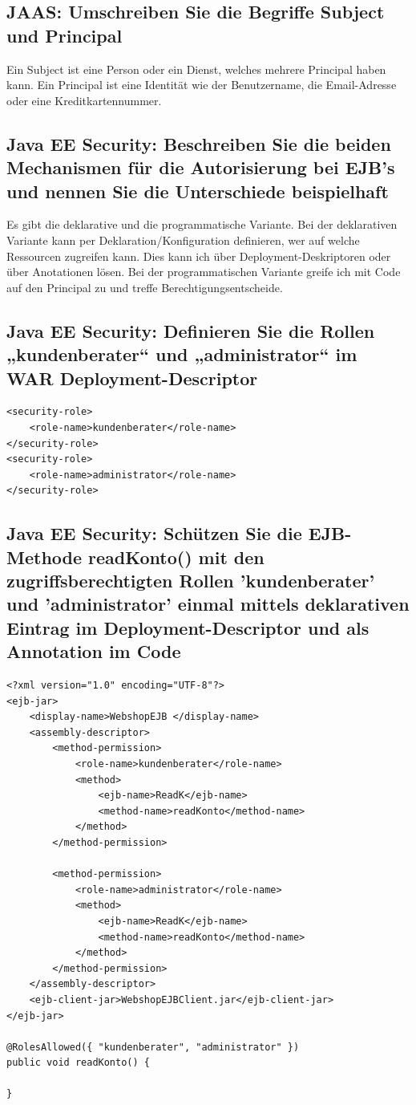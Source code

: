 \subsection{JAAS: Umschreiben Sie die Begriffe Subject und Principal}
Ein Subject ist eine Person oder ein Dienst, welches mehrere Principal haben kann. Ein Principal ist eine Identität wie der Benutzername, die Email-Adresse oder eine Kreditkartennummer.

\subsection{Java EE Security: Beschreiben Sie die beiden Mechanismen für die Autorisierung bei EJB's und nennen Sie die Unterschiede beispielhaft}

Es gibt die deklarative und die programmatische Variante. Bei der deklarativen Variante kann per Deklaration/Konfiguration definieren, wer auf welche Ressourcen zugreifen kann. Dies kann ich über Deployment-Deskriptoren oder über Anotationen lösen. Bei der programmatischen Variante greife ich mit Code auf den Principal zu und treffe Berechtigungsentscheide.

\subsection{Java EE Security: Definieren Sie die Rollen „kundenberater“ und „administrator“ im WAR Deployment-Descriptor}

\begin{lstlisting}
<security-role>
	<role-name>kundenberater</role-name>
</security-role>
<security-role>
	<role-name>administrator</role-name>
</security-role>
\end{lstlisting}

\subsection{Java EE Security: Schützen Sie die EJB-Methode readKonto() mit den zugriffsberechtigten Rollen	'kundenberater' und 'administrator' einmal mittels deklarativen Eintrag im Deployment-Descriptor und als Annotation im Code}

\begin{lstlisting}
<?xml version="1.0" encoding="UTF-8"?>
<ejb-jar>
	<display-name>WebshopEJB </display-name>
	<assembly-descriptor>
		<method-permission>
			<role-name>kundenberater</role-name>
			<method>
				<ejb-name>ReadK</ejb-name>
				<method-name>readKonto</method-name>
			</method>
		</method-permission>
	
		<method-permission>
			<role-name>administrator</role-name>
			<method>
				<ejb-name>ReadK</ejb-name>
				<method-name>readKonto</method-name>
			</method>
		</method-permission>
	</assembly-descriptor>
	<ejb-client-jar>WebshopEJBClient.jar</ejb-client-jar> 
</ejb-jar>

@RolesAllowed({ "kundenberater", "administrator" })
public void readKonto() {

}
\end{lstlisting}

